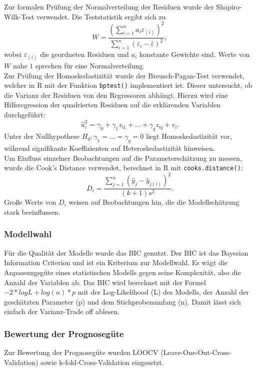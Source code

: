 Zur formalen Prüfung der Normalverteilung der Residuen wurde der Shapiro-Wilk-Test verwendet. Die Teststatistik ergibt sich zu
\[W = \frac{\left( \sum_{i=1}^n a_i \varepsilon_{(i)} \right)^2}{\sum_{i=1}^n (\varepsilon_i - \bar{\varepsilon})^2},\]
wobei \(\varepsilon_{(i)}\) die geordneten Residuen und \(a_i\) konstante Gewichte sind. Werte von \(W\) nahe \(1\) sprechen für eine Normalverteilung.\\

Zur Prüfung der Homoskedastizität wurde der Breusch-Pagan-Test verwendet, welcher in R mit der Funktion \texttt{bptest()} implementiert ist. Dieser untersucht, ob die Varianz der Residuen von den Regressoren abhängt. Hierzu wird eine Hilfsregression der quadrierten Residuen auf die erklärenden Variablen durchgeführt:
\[\hat{u}_i^2 = \gamma_0 + \gamma_1 z_{i1} + \dots + \gamma_q z_{iq} + v_i.\]
Unter der Nullhypothese \(H_0: \gamma_1 = \dots = \gamma_q = 0\) liegt Homoskedastizität vor, während signifikante Koeffizienten auf Heteroskedastizität hinweisen.\\

Um Einfluss einzelner Beobachtungen auf die Parameterschätzung zu messen, wurde die Cook's Distance verwendet, berechnet in R mit \texttt{cooks.distance()}:
$$D_i = \frac{\sum_{j=1}^n (\hat{y}_j - \hat{y}_{j(i)})^2}{(k + 1) s^2}.$$
Große Werte von \(D_i\) weisen auf Beobachtungen hin, die die Modellschätzung stark beeinflussen.\\

\subsubsection{Modellwahl}
Für die Qualität der Modelle wurde das BIC genutzt. Der BIC ist das Bayesian Information Criterion und ist
ein Kriterium zur Modellwahl. Es wägt die Anpassungsgüte eines statistischen Modells gegen seine Komplexität, also die Anzahl der
Variablen ab. Das BIC wird berechnet mit der Formel $-2*logL+log(n)*p$ mit der Log-Likelihood (L) des Modells, der Anzahl der
geschätzten Parameter (p) und dem Stichprobenumfang (n). Damit lässt sich einfach der Varianz-Trade off ablesen.\\

\subsubsection{Bewertung der Prognosegüte}
Zur Bewertung der Prognosegüte wurden LOOCV (Leave-One-Out-Cross-Validation) sowie k-fold-Cross-Validation eingesetzt.\\

